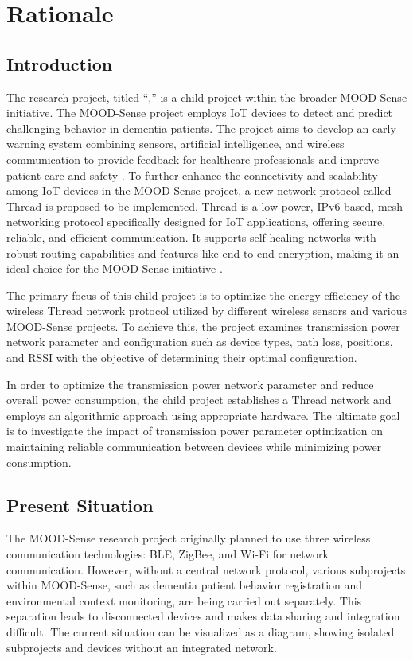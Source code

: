 \chapter{Rationale}\label{chap:rationale}

\section{Introduction}

The research project, titled ``\makeatletter\@title\makeatother,'' is a child project within the broader MOOD-Sense initiative. The MOOD-Sense project employs \gls{IoT} devices to detect and predict challenging behavior in dementia patients. The project aims to develop an early warning system combining sensors, artificial intelligence, and wireless communication to provide feedback for healthcare professionals and improve patient care and safety \cite{MOOD-Sense_Research}. To further enhance the connectivity and scalability among \gls{IoT} devices in the MOOD-Sense project, a new network protocol called Thread is proposed to be implemented. Thread is a low-power, IPv6-based, mesh networking protocol specifically designed for \gls{IoT} applications, offering secure, reliable, and efficient communication. It supports self-healing networks with robust routing capabilities and features like end-to-end encryption, making it an ideal choice for the MOOD-Sense initiative \cite{Thread_Group_Benefits}.

The primary focus of this child project is to optimize the energy efficiency of the wireless Thread network protocol utilized by different wireless sensors and various MOOD-Sense projects. To achieve this, the project examines transmission power network parameter and configuration such as device types, path loss, positions, and \gls{RSSI} with the objective of determining their optimal configuration.

In order to optimize the transmission power network parameter and reduce overall power consumption, the child project establishes a Thread network and employs an algorithmic approach using appropriate hardware. The ultimate goal is to investigate the impact of transmission power parameter optimization on maintaining reliable communication between devices while minimizing power consumption.


\section{Present Situation}\label{sec:present_situation}
The MOOD-Sense research project originally planned to use three wireless communication technologies: \gls{BLE}, ZigBee, and Wi-Fi for network communication. However, without a central network protocol, various subprojects within MOOD-Sense, such as dementia patient behavior registration and environmental context monitoring, are being carried out separately. This separation leads to disconnected devices and makes data sharing and integration difficult. The current situation can be visualized as a diagram, showing isolated subprojects and devices without an integrated network.

